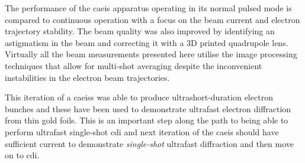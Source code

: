 The performance of the \gls{caeis} apparatus operating in its normal pulsed mode is compared to continuous operation with a focus on the beam current and electron trajectory stability.
The beam quality was also improved by identifying an astigmatism in the beam and correcting it with a 3D printed quadrupole lens.
Virtually all the beam measurements presented here utilise the image processing techniques that allow for multi-shot averaging despite the inconvenient instabilities in the electron beam trajectories.

This iteration of a \glspl{caeis} was able to produce ultrashort-duration electron bunches and these have been used to demonstrate ultrafast electron diffraction from thin gold foils.
This is an important step along the path to being able to perform ultrafast single-shot \gls{cdi} and next iteration of the \gls{caeis} should have sufficient current to demonstrate \emph{single-shot} ultrafast diffraction and then move on to \gls{cdi}.